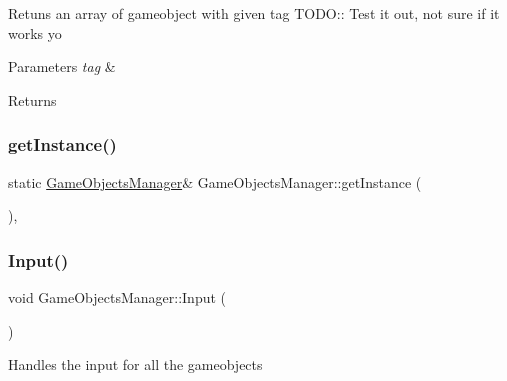 Retuns an array of gameobject with given tag T\+O\+DO\+:\+: Test it out, not sure if it works yo 


\begin{DoxyParams}{Parameters}
{\em tag} & \\
\hline
\end{DoxyParams}
\begin{DoxyReturn}{Returns}

\end{DoxyReturn}
\mbox{\label{class_game_objects_manager_a905058214bee04ccfd466381261d4c0e}} 
\subsubsection{\texorpdfstring{get\+Instance()}{getInstance()}}
{\footnotesize\ttfamily static \mbox{\hyperlink{class_game_objects_manager}{Game\+Objects\+Manager}}\& Game\+Objects\+Manager\+::get\+Instance (\begin{DoxyParamCaption}{ }\end{DoxyParamCaption})\hspace{0.3cm}{\ttfamily [inline]}, {\ttfamily [static]}}

\mbox{\label{class_game_objects_manager_a9f5ca8d981a423e9c5ab56978a1cd99e}} 
\subsubsection{\texorpdfstring{Input()}{Input()}}
{\footnotesize\ttfamily void Game\+Objects\+Manager\+::\+Input (\begin{DoxyParamCaption}{ }\end{DoxyParamCaption})}



Handles the input for all the gameobjects 

\mbox{\label{class_game_objects_manager_ac77aa52afc2dfbb678c51a27022fc60a}} 
